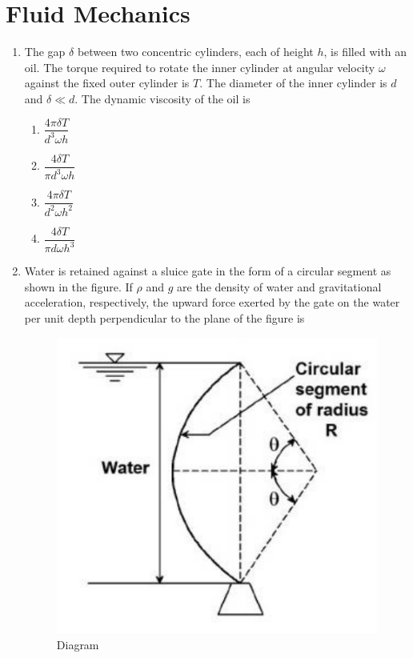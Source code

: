 \documentclass[journal,12pt,onecolumn]{IEEEtran}
\begin{document}
\newpage

\section*{Fluid Mechanics}
\vspace{1cm}
\begin{enumerate}[label=\arabic*)]

\item The gap $\delta$ between two concentric cylinders, each of height $h$, is filled with an oil. The torque required to rotate the inner cylinder at angular velocity $\omega$ against the fixed outer cylinder is $T$. The diameter of the inner cylinder is $d$ and $\delta \ll d$. The dynamic viscosity of the oil is  
\hfill{} \\

\vspace{0.2cm}
\begin{enumerate}[label=\alph*)]
\item $\dfrac{4\pi \delta T}{d^3 \omega h}$
\vspace{0.1cm}
\item $\dfrac{4\delta T}{\pi d^3 \omega h}$
\vspace{0.1cm}
\item $\dfrac{4\pi \delta T}{d^2 \omega h^2}$
\vspace{0.1cm}
\item $\dfrac{4\delta T}{\pi d \omega h^3}$
\end{enumerate}
\vspace{0.5cm}

\item Water is retained against a sluice gate in the form of a circular segment as shown in the figure. If $\rho$ and $g$ are the density of water and gravitational acceleration, respectively, the upward force exerted by the gate on the water per unit depth perpendicular to the plane of the figure is  

\begin{figure}[htbp]
  \centering
  \includegraphics[width=.6\linewidth]{figs/B/fig1.png} 
  \caption{Diagram}
  \label{B/fig1}
\end{figure}



\end{enumerate}
\end{document}
